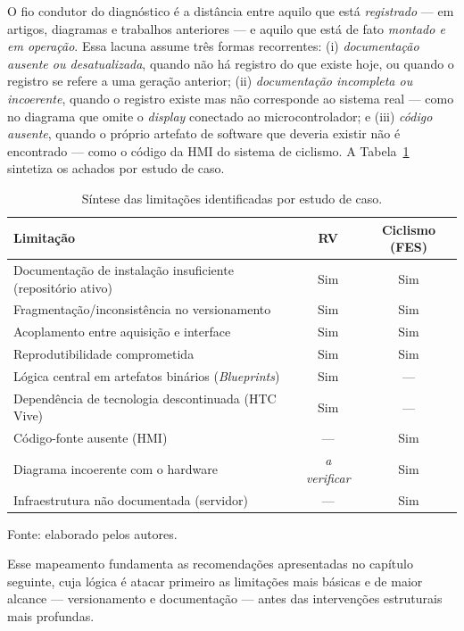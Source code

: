 O fio condutor do diagnóstico é a distância entre aquilo que está \emph{registrado} ---
em artigos, diagramas e trabalhos anteriores --- e aquilo que está de fato \emph{montado e
em operação}. Essa lacuna assume três formas recorrentes: (i) \emph{documentação ausente ou
desatualizada}, quando não há registro do que existe hoje, ou quando o registro se refere a
uma geração anterior; (ii) \emph{documentação incompleta ou incoerente}, quando o registro
existe mas não corresponde ao sistema real --- como no diagrama que omite o \emph{display}
conectado ao microcontrolador; e (iii) \emph{código ausente}, quando o próprio artefato de
software que deveria existir não é encontrado --- como o código da HMI do sistema de
ciclismo. A Tabela~\ref{tab:diagnostico} sintetiza os achados por estudo de caso.

\begin{table}[H]
	\centering
	\caption{Síntese das limitações identificadas por estudo de caso.}
	\label{tab:diagnostico}
	\begin{tabular}{p{6.2cm} c c}
		\hline
		\textbf{Limitação} & \textbf{RV} & \textbf{Ciclismo (FES)} \\
		\hline
		Documentação de instalação insuficiente (repositório ativo) & Sim & Sim \\
		Fragmentação/inconsistência no versionamento & Sim & Sim \\
		Acoplamento entre aquisição e interface & Sim & Sim \\
		Reprodutibilidade comprometida & Sim & Sim \\
		Lógica central em artefatos binários (\emph{Blueprints}) & Sim & --- \\
		Dependência de tecnologia descontinuada (HTC Vive) & Sim & --- \\
		Código-fonte ausente (HMI) & --- & Sim \\
		Diagrama incoerente com o hardware & \emph{a verificar} & Sim \\
		Infraestrutura não documentada (servidor) & --- & Sim \\
		\hline
	\end{tabular}

	\vspace{4pt}
	{\footnotesize Fonte: elaborado pelos autores.}
\end{table}

Esse mapeamento fundamenta as recomendações apresentadas no capítulo seguinte, cuja lógica
é atacar primeiro as limitações mais básicas e de maior alcance --- versionamento e
documentação --- antes das intervenções estruturais mais profundas.
